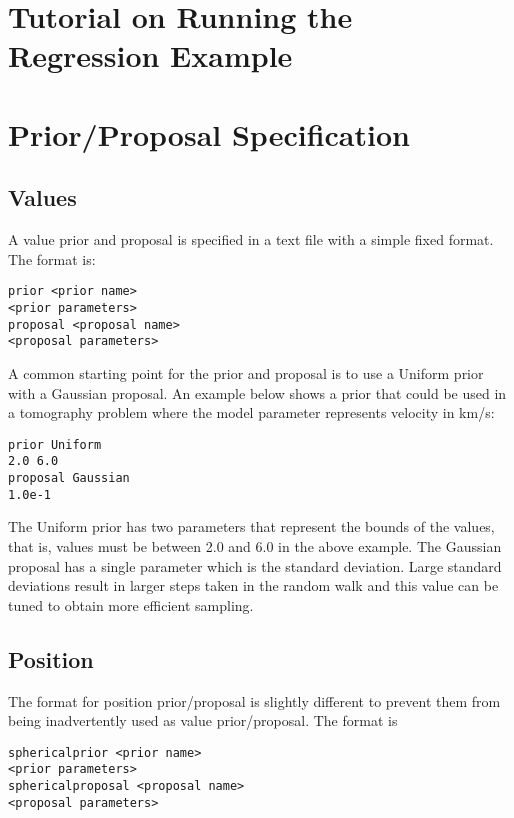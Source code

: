 \documentclass{article}
\begin{document}
\section{Tutorial on Running the Regression Example}


\section{Prior/Proposal Specification}

\subsection{Values}

A value prior and proposal is specified in a text file with a simple
fixed format.  The format is:

\begin{verbatim}
prior <prior name>
<prior parameters>
proposal <proposal name>
<proposal parameters>
\end{verbatim}

A common starting point for the prior and proposal is to use
a Uniform prior with a Gaussian proposal. An example below shows
a prior that could be used in a tomography problem where the model
parameter represents velocity in km/s:

\begin{verbatim}
prior Uniform
2.0 6.0
proposal Gaussian
1.0e-1
\end{verbatim}

The Uniform prior has two parameters that represent the bounds of
the values, that is, values must be between 2.0 and 6.0 in the
above example. The Gaussian proposal has a single parameter which
is the standard deviation. Large standard deviations result in
larger steps taken in the random walk and this value can be
tuned to obtain more efficient sampling.

\subsection{Position}

The format for position prior/proposal is slightly different to prevent
them from being inadvertently used as value prior/proposal. The format
is 

\begin{verbatim}
sphericalprior <prior name>
<prior parameters>
sphericalproposal <proposal name>
<proposal parameters>
\end{verbatim}
\end{document}
